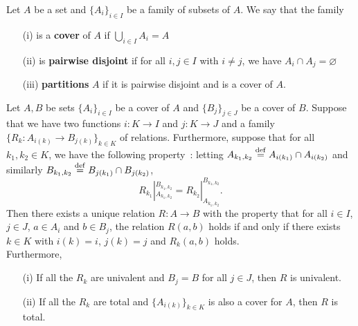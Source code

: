 \begin{definition} %
	Let $A$ be a set and $\{A_i\}_{i \in I}$ be a family of subsets of $A$. We say that the family 
	\\
	\begin{itemize}
		\item[(i)] is a \textbf{cover} of $A$ if $\bigcup_{i \in I} A_i = A$
		\\

		\item[(ii)] is \textbf{pairwise disjoint} if for all $i,j \in I$ with $i \neq j$, we have $A_i \cap A_j = \varnothing$
		\\

		\item[(iii)] \textbf{partitions} $A$ if it is pairwise disjoint and is a cover of $A$.
		\\

	\end{itemize}
\end{definition}

\begin{proposition} \label{glueing-relations}
	Let $A,B$ be sets $\{A_i\}_{i \in I}$ be a cover of $A$ and $\{B_j\}_{j \in J}$ be a cover of $B$. Suppose that we have two functions $i : K \to I$ and $j : K \to J$ and a family $\{R_k : A_{i(k)} \to B_{j(k)}\}_{k \in K}$ of relations. Furthermore, suppose that for all $k_1,k_2 \in K$, we have the following property~: letting $A_{k_1,k_2} \overset{\mathrm{def}}{=} A_{i(k_1)} \cap A_{i(k_2)}$ and similarly $B_{k_1,k_2} \overset{\mathrm{def}}{=} B_{j(k_1)} \cap B_{j(k_2)}$, 
	\[
		R_{k_1}|_{A_{k_1,k_2}}^{B_{k_1,k_2}} = R_{k_2}|_{A_{k_1,k_2}}^{B_{k_1,k_2}}.
	\]
	Then there exists a unique relation $R : A \to B$ with the property that for all $i \in I$, $j \in J$, $a \in A_i$ and $b \in B_j$, the relation $R(a,b)$ holds if and only if there exists $k \in K$ with $i(k) = i$, $j(k) = j$ and $R_k(a,b)$ holds. 
	\\

	Furthermore,
	\begin{itemize}
		\item[(i)] If all the $R_k$ are univalent and $B_j = B$ for all $j \in J$, then $R$ is univalent.
		\item[(ii)] If all the $R_k$ are total and $\{A_{i(k)}\}_{k \in K}$ is also a cover for $A$, then $R$ is total.
	\end{itemize}
\end{proposition}

